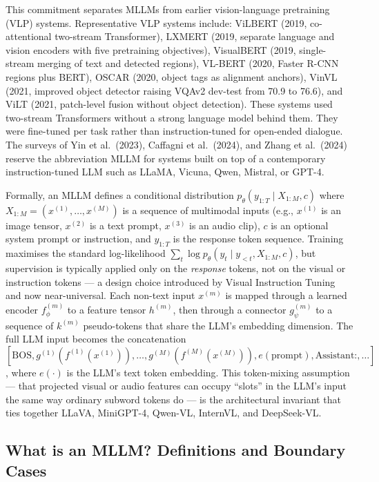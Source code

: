 \documentclass{article}
\begin{document}
This commitment separates MLLMs from earlier vision-language pretraining (VLP) systems. Representative VLP systems include: ViLBERT (2019, co-attentional two-stream Transformer), LXMERT (2019, separate language and vision encoders with five pretraining objectives), VisualBERT (2019, single-stream merging of text and detected regions), VL-BERT (2020, Faster R-CNN regions plus BERT), OSCAR (2020, object tags as alignment anchors), VinVL (2021, improved object detector raising VQAv2 dev-test from 70.9 to 76.6), and ViLT (2021, patch-level fusion without object detection). These systems used two-stream Transformers without a strong language model behind them. They were fine-tuned per task rather than instruction-tuned for open-ended dialogue. The surveys of Yin et al.~(2023), Caffagni et al.~(2024), and Zhang et al.~(2024) reserve the abbreviation MLLM for systems built on top of a contemporary instruction-tuned LLM such as LLaMA, Vicuna, Qwen, Mistral, or GPT-4.

Formally, an MLLM defines a conditional distribution \(p_\theta(y_{1:T} \mid X_{1:M}, c)\) where \(X_{1:M} = (x^{(1)}, \ldots, x^{(M)})\) is a sequence of multimodal inputs (e.g., \(x^{(1)}\) is an image tensor, \(x^{(2)}\) is a text prompt, \(x^{(3)}\) is an audio clip), \(c\) is an optional system prompt or instruction, and \(y_{1:T}\) is the response token sequence. Training maximises the standard log-likelihood \(\sum_t \log p_\theta(y_t \mid y_{<t}, X_{1:M}, c)\), but supervision is typically applied only on the \emph{response} tokens, not on the visual or instruction tokens --- a design choice introduced by Visual Instruction Tuning \citep{liu2023visualinstructiont} and now near-universal. Each non-text input \(x^{(m)}\) is mapped through a learned encoder \(f^{(m)}_\phi\) to a feature tensor \(h^{(m)}\), then through a connector \(g^{(m)}_\psi\) to a sequence of \(k^{(m)}\) pseudo-tokens that share the LLM's embedding dimension. The full LLM input becomes the concatenation \([\text{BOS}, g^{(1)}(f^{(1)}(x^{(1)})), \ldots, g^{(M)}(f^{(M)}(x^{(M)})), e(\text{prompt}), \text{Assistant:}, \ldots]\), where \(e(\cdot)\) is the LLM's text token embedding. This token-mixing assumption --- that projected visual or audio features can occupy ``slots'' in the LLM's input the same way ordinary subword tokens do --- is the architectural invariant that ties together LLaVA, MiniGPT-4, Qwen-VL, InternVL, and DeepSeek-VL.

\subsection{What is an MLLM? Definitions and Boundary Cases}\label{what-is-an-mllm-definitions-and-boundary-cases}
\end{document}
